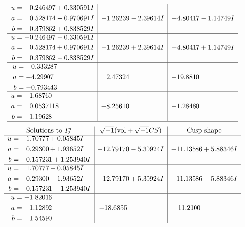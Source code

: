 \documentclass[1p]{elsarticle_modified}
\theoremstyle{definition}
\newcommand{\I}{\sqrt{-1}}
\begin{document}
$$\begin{array}{c|c|c}
\begin{aligned}
u &= -0.246497 + 0.330591 I \\
a &= \phantom{-}0.528174 - 0.970691 I \\
b &= \phantom{-}0.379862 + 0.838529 I\end{aligned}
 & -1.26239 - 2.39614 I & -4.80417 - 1.14749 I \\ \hline\begin{aligned}
u &= -0.246497 - 0.330591 I \\
a &= \phantom{-}0.528174 + 0.970691 I \\
b &= \phantom{-}0.379862 - 0.838529 I\end{aligned}
 & -1.26239 + 2.39614 I & -4.80417 + 1.14749 I \\ \hline\begin{aligned}
u &= \phantom{-}0.333287\phantom{ +0.000000I} \\
a &= -4.29907\phantom{ +0.000000I} \\
b &= -0.793443\phantom{ +0.000000I}\end{aligned}
 & \phantom{-}2.47324\phantom{ +0.000000I} & -19.8810\phantom{ +0.000000I} \\ \hline\begin{aligned}
u &= -1.68760\phantom{ +0.000000I} \\
a &= \phantom{-}0.0537118\phantom{ +0.000000I} \\
b &= -1.19628\phantom{ +0.000000I}\end{aligned}
 & -8.25610\phantom{ +0.000000I} & -1.28480\phantom{ +0.000000I}\\
 \hline 
 \end{array}$$\newpage$$\begin{array}{c|c|c}  
\text{Solutions to }I^u_{2}& \I (\text{vol} + \sqrt{-1}CS) & \text{Cusp shape}\\
 \hline 
\begin{aligned}
u &= \phantom{-}1.70777 + 0.05845 I \\
a &= \phantom{-}0.29300 + 1.93652 I \\
b &= -0.157231 + 1.253940 I\end{aligned}
 & -12.79170 - 5.30924 I & -11.13586 + 5.88346 I \\ \hline\begin{aligned}
u &= \phantom{-}1.70777 - 0.05845 I \\
a &= \phantom{-}0.29300 - 1.93652 I \\
b &= -0.157231 - 1.253940 I\end{aligned}
 & -12.79170 + 5.30924 I & -11.13586 - 5.88346 I \\ \hline\begin{aligned}
u &= -1.82016\phantom{ +0.000000I} \\
a &= \phantom{-}1.12892\phantom{ +0.000000I} \\
b &= \phantom{-}1.54590\phantom{ +0.000000I}\end{aligned}
 & -18.6855\phantom{ +0.000000I} & \phantom{-}11.2100\phantom{ +0.000000I}\\
 \hline 
 \end{array}$$\newpage
\end{document}
